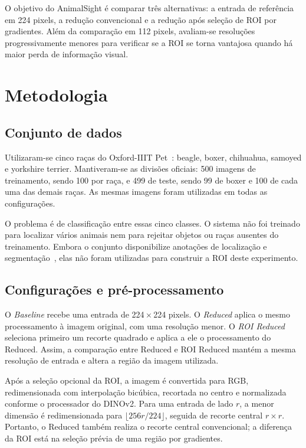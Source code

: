 \documentclass[conference]{IEEEtran}
\begin{document}
O objetivo do AnimalSight é comparar três alternativas: a entrada
de referência em 224 pixels, a redução convencional e a redução após
seleção de ROI por gradientes. Além da comparação em 112 pixels,
avaliam-se resoluções progressivamente menores para verificar se a ROI
se torna vantajosa quando há maior perda de informação visual.

\section{Metodologia}
\subsection{Conjunto de dados}
Utilizaram-se cinco raças do Oxford-IIIT Pet~\cite{pets}: beagle,
boxer, chihuahua, samoyed e yorkshire terrier. Mantiveram-se as divisões
oficiais: 500 imagens de treinamento, sendo 100 por raça, e 499 de
teste, sendo 99 de boxer e 100 de cada uma das demais raças.
As mesmas imagens foram utilizadas em todas as configurações.

O problema é de classificação entre essas cinco classes. O sistema
não foi treinado para localizar vários animais nem para rejeitar
objetos ou raças ausentes do treinamento. Embora o conjunto disponibilize
anotações de localização e segmentação~\cite{pets}, elas não foram
utilizadas para construir a ROI deste experimento.

\subsection{Configurações e pré-processamento}
O \textit{Baseline} recebe uma entrada de 224\,$\times$\,224 pixels.
O \textit{Reduced} aplica o mesmo processamento à imagem original,
com uma resolução menor. O \textit{ROI Reduced} seleciona primeiro
um recorte quadrado e aplica a ele o processamento do Reduced.
Assim, a comparação entre Reduced e ROI Reduced mantém a mesma
resolução de entrada e altera a região da imagem utilizada.

Após a seleção opcional da ROI, a imagem é convertida para RGB,
redimensionada com interpolação bicúbica, recortada no centro e
normalizada conforme o processador do DINOv2. Para uma entrada de
lado $r$, a menor dimensão é redimensionada para
$\lfloor 256r/224 \rfloor$, seguida de recorte central $r\times r$.
Portanto, o Reduced também realiza o recorte central convencional;
a diferença da ROI está na seleção prévia de uma região por gradientes.
\end{document}

